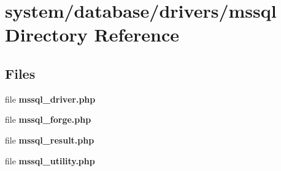 \section{system/database/drivers/mssql Directory Reference}
\label{dir_5c5927f348e9c8783c8a11b99154faf8}
\subsection*{Files}
\begin{DoxyCompactItemize}
\item 
file {\bf mssql\-\_\-driver.\-php}
\item 
file {\bf mssql\-\_\-forge.\-php}
\item 
file {\bf mssql\-\_\-result.\-php}
\item 
file {\bf mssql\-\_\-utility.\-php}
\end{DoxyCompactItemize}
